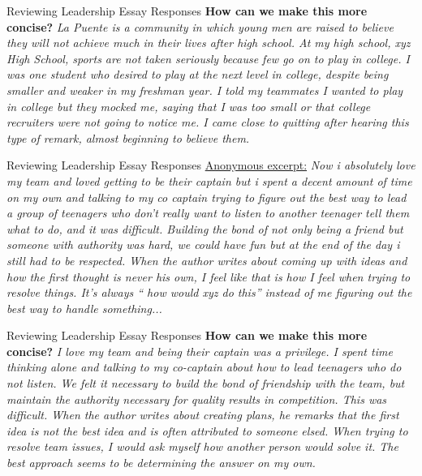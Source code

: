 \documentclass{beamer}
\begin{document}
\begin{frame}{Reviewing Leadership Essay Responses}
\textbf{How can we make this more concise?}
\textit{La Puente is a community in which young men are raised to believe they will not achieve much in
their lives after high school. At my high school, xyz High School, sports are not taken
seriously because few go on to play in college. I was one student who desired to play at the next
level in college, despite being smaller and weaker in my freshman year. I told my teammates I
wanted to play in college but they mocked me, saying that I was too small or that college
recruiters were not going to notice me. I came close to quitting after hearing this type of remark,
almost beginning to believe them.}
\end{frame}

\begin{frame}{Reviewing Leadership Essay Responses}
\underline{Anonymous excerpt:}
\textit{Now i absolutely love my team and loved getting to be their captain but i spent a
decent amount of time on my own and talking to my co captain trying to figure out the best way
to lead a group of teenagers who don't really want to listen to another teenager tell them what to
do, and it was difficult. Building the bond of not only being a friend but someone with authority
was hard, we could have fun but at the end of the day i still had to be respected. When the
author writes about coming up with ideas and how the first thought is never his own, I feel like
that is how I feel when trying to resolve things. It's always `` how would xyz do this'' instead of
me figuring out the best way to handle something...}
\end{frame}

\begin{frame}{Reviewing Leadership Essay Responses}
\textbf{How can we make this more concise?}
\textit{I love my team and being their captain was a privilege.  I spent time thinking alone and talking to my co-captain about how to lead teenagers who do not listen.  We felt it necessary to build the bond of friendship with the team, but maintain the authority necessary for quality results in competition.  This was difficult.  When the author writes about creating plans, he remarks that the first idea is not the best idea and is often attributed to someone elsed.  When trying to resolve team issues, I would ask myself how another person would solve it.  The best approach seems to be determining the answer on my own.}
\end{frame}
\end{document}
